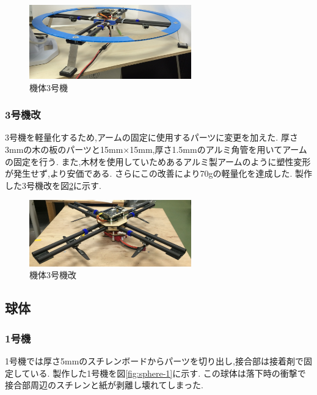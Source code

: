 \documentclass[12pt,oneside]{sotsuken_paper}
\begin{document}
\begin{figure}[htbp]
	\begin{center}
		\includegraphics[width=70mm]{image/drone/drone-3-1.jpg}
		\caption{機体3号機}
		\label{fig:drone-3-1}
	\end{center}
\end{figure}

\subsubsection{3号機改}
3号機を軽量化するため,アームの固定に使用するパーツに変更を加えた.
厚さ3mmの木の板のパーツと15mm×15mm,厚さ1.5mmのアルミ角管を用いてアームの固定を行う.
また,木材を使用していためあるアルミ製アームのように塑性変形が発生せず,より安価である.
さらにこの改善により70gの軽量化を達成した.
製作した3号機改を図\ref{fig:drone-3-2}に示す.

\begin{figure}[htbp]
	\begin{center}
		\includegraphics[width=70mm]{image/drone/drone-3-2.jpg}
		\caption{機体3号機改}
		\label{fig:drone-3-2}
	\end{center}
\end{figure}

\subsection{球体}

\subsubsection{1号機}
1号機では厚さ5mmのスチレンボードからパーツを切り出し,接合部は接着剤で固定している.
製作した1号機を図\ref{fig:sphere-1}に示す.
この球体は落下時の衝撃で接合部周辺のスチレンと紙が剥離し壊れてしまった.
\end{document}
